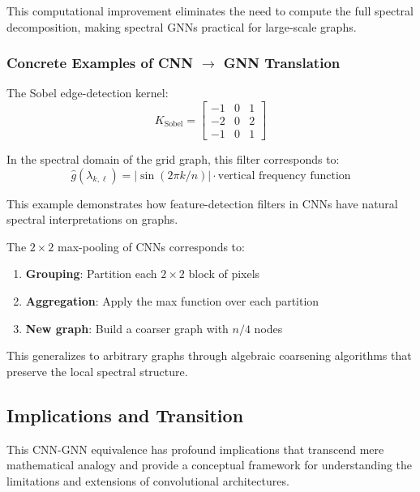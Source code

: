 This computational improvement eliminates the need to compute the full spectral decomposition, making spectral \glspl{GNN} practical for large-scale graphs.

\subsubsection{Concrete Examples of CNN $\rightarrow$ GNN Translation}

\begin{example}
The Sobel edge-detection kernel:
\[
K_{\text{Sobel}} = \begin{bmatrix} -1 & 0 & 1 \\ -2 & 0 & 2 \\ -1 & 0 & 1 \end{bmatrix}
\]

In the spectral domain of the grid graph, this filter corresponds to:
\[
\hat{g}(\lambda_{k,\ell}) = |\sin(2\pi k/n)| \cdot \text{vertical frequency function}
\]

This example demonstrates how feature-detection filters in \glspl{CNN} have natural spectral interpretations on graphs.
\end{example}

\begin{example}
The $2 \times 2$ max-pooling of \glspl{CNN} corresponds to:
\begin{enumerate}
    \item \textbf{Grouping}: Partition each $2 \times 2$ block of pixels
    \item \textbf{Aggregation}: Apply the max function over each partition
    \item \textbf{New graph}: Build a coarser graph with $n/4$ nodes
\end{enumerate}

This generalizes to arbitrary graphs through algebraic coarsening algorithms that preserve the local spectral structure.
\end{example}

\subsection{Implications and Transition}\label{subsec:implicaciones_transicion_cnn_gnn}

This \gls{CNN}-\gls{GNN} equivalence has profound implications that transcend mere mathematical analogy and provide a conceptual framework for understanding the limitations and extensions of convolutional architectures.

